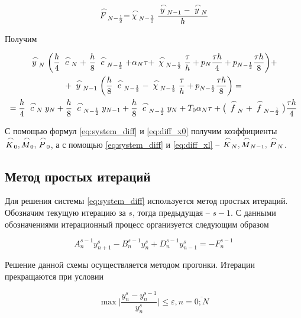 \begin{equation}\label{eq:F_N-1_2}
    \LittleCap{F}_{N-\frac{1}{2}} = \LittleCap{\chi}_{N-\frac{1}{2}} \frac{\LittleCap{y}_{N-1} - \LittleCap{y}_N}{h}
\end{equation}

Получим

\begin{multline}\label{eq:diff_xl}
    \LittleCap{y}_N \bigg( \frac{h}{4} \LittleCap{c}_N +\ \frac{h}{8} \LittleCap{c}_{N-\frac{1}{2}} + \alpha_N \tau + \LittleCap{\chi}_{N-\frac{1}{2}} \frac{\tau}{h} + p_N \frac{\tau h}{4} + p_{N-\frac{1}{2}} \frac{\tau h}{8} \bigg) + \\
    + \LittleCap{y}_{N-1} \bigg( \frac{h}{8} \LittleCap{c}_{N-\frac{1}{2}} - \LittleCap{\chi}_{N-\frac{1}{2}} \frac{\tau}{h} + p_{N-\frac{1}{2}} \frac{\tau h}{8} \bigg) = \\
    = \frac{h}{4} \LittleCap{c}_N y_N + \frac{h}{8} \LittleCap{c}_{N-\frac{1}{2}} y_{N-1} + \frac{h}{8} \LittleCap{c}_{N-\frac{1}{2}} y_N + T_0 \alpha_N \tau + \big( \LittleCap{f}_N + \LittleCap{f}_{N-\frac{1}{2}} \big) \frac{\tau h}{4}
\end{multline}

С помощью формул \ref{eq:system_diff} и \ref{eq:diff_x0} получим коэффициенты $\LittleCap{K}_0, \LittleCap{M}_0, \LittleCap{P}_0$, а с помощью \ref{eq:system_diff} и \ref{eq:diff_xl} -- $\LittleCap{K}_N, \LittleCap{M}_{N-1}, \LittleCap{P}_N$.

\subsection{Метод простых итераций}

Для решения системы \ref{eq:system_diff} используется метод простых итераций. Обозначим текущую итерацию за $s$, тогда предыдущая -- $s - 1$. С данными обозначениями итерационный процесс организуется следующим образом

\begin{equation*}
    A_n^{s-1} y_{n+1}^s - B_{n}^{s-1} y_n^s + D_n^{s-1} y_{n-1}^s = -F_n^{s-1}
\end{equation*}

Решение данной схемы осуществляется методом прогонки. Итерации прекращаются при условии

\begin{equation*}
    \max \bigg| \frac{y_n^s - y_n^{s-1}}{y_n^s} \bigg| \le \varepsilon, n = \overline{0;N}
\end{equation*}

